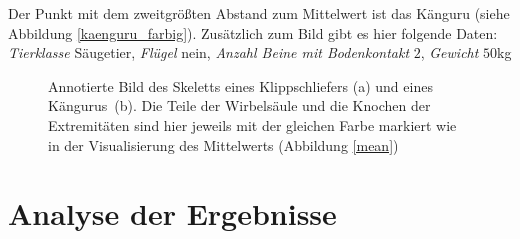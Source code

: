  Der Punkt mit dem zweitgrößten Abstand zum Mittelwert ist das Känguru (siehe Abbildung \ref{kaenguru_farbig}). Zusätzlich zum Bild gibt es hier folgende Daten:
  \emph{Tierklasse} Säugetier, \emph{Flügel} nein, \emph{Anzahl Beine mit Bodenkontakt} $2$, \emph{Gewicht} $50$kg
  
 \begin{figure}
  \qquad
  
  \caption{Annotierte Bild des Skeletts eines Klippschliefers (a) und eines \mbox{Kängurus (b)}. Die Teile der Wirbelsäule und die Knochen der Extremitäten sind hier jeweils mit der gleichen Farbe markiert wie in der Visualisierung des Mittelwerts (Abbildung \ref{mean})}
 \end{figure}
 

 \section{Analyse der Ergebnisse}
 \label{section_pca_result_analysis}
 
